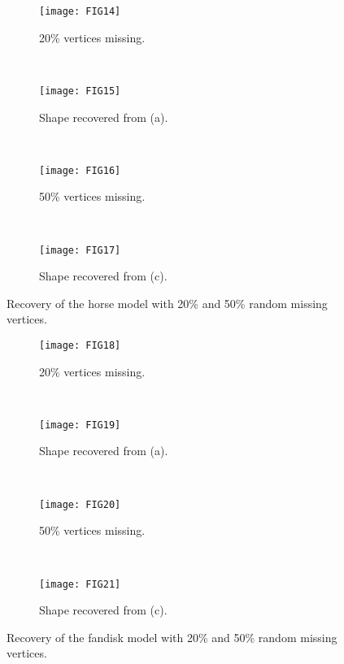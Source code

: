 \begin{figure}
  \centering
    \begin{subfigure}[b]{0.23\linewidth}
        \texttt{[image: FIG14]}
        \caption{20\% vertices missing.}
    \end{subfigure}
    ~
    \begin{subfigure}[b]{0.23\linewidth}
        \texttt{[image: FIG15]}
        \caption{Shape recovered from (a).}
    \end{subfigure}
    ~
    \begin{subfigure}[b]{0.23\linewidth}
        \texttt{[image: FIG16]}
        \caption{50\% vertices missing.}
    \end{subfigure}
    ~
    \begin{subfigure}[b]{0.23\linewidth}
        \texttt{[image: FIG17]}
        \caption{Shape recovered from (c).}
    \end{subfigure}
\caption[Recovery of the horse model with random missing vertices.]
{Recovery of the horse model with 20\% and 50\% random missing vertices.}
\label{fig:horse:recovery}
\end{figure}

\begin{figure}
  \centering
    \begin{subfigure}[b]{0.23\linewidth}
        \texttt{[image: FIG18]}
        \caption{20\% vertices missing.}
    \end{subfigure}
    ~
    \begin{subfigure}[b]{0.23\linewidth}
        \texttt{[image: FIG19]}
        \caption{Shape recovered from (a).}
    \end{subfigure}
    ~
    \begin{subfigure}[b]{0.23\linewidth}
        \texttt{[image: FIG20]}
        \caption{50\% vertices missing.}
    \end{subfigure}
    ~
    \begin{subfigure}[b]{0.23\linewidth}
        \texttt{[image: FIG21]}
        \caption{Shape recovered from (c).}
    \end{subfigure}
\caption[Recovery of the fandisk model with random missing vertices.]
{Recovery of the fandisk model with 20\% and 50\% random missing vertices.}
\label{fig:fandisk:recovery}
\end{figure}

